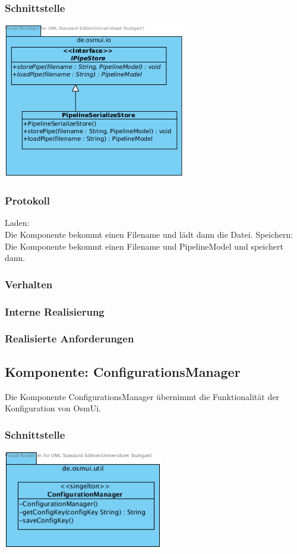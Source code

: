 \documentclass[a4paper,12pt]{scrartcl}
\begin{document}
\subsubsection{Schnittstelle}
\begin{center}
\includegraphics[width=8cm]{Schnittstelle_IPipeStore.png}
\end{center}
\subsubsection{Protokoll}
Laden: \\
Die Komponente bekommt einen Filename und lädt dann die Datei.
Speichern: \\
Die Komponente bekommt einen Filename und PipelineModel und speichert dann.
\subsubsection{Verhalten}
\subsubsection{Interne Realisierung}
\subsubsection{Realisierte Anforderungen}

\subsection{Komponente: ConfigurationsManager}
Die Komponente ConfigurationsManager übernimmt die Funktionalität der Konfiguration von OsmUi.
\subsubsection{Schnittstelle}
\begin{center}
\includegraphics[width=7cm]{Schnittstelle_ConfigurationManager.png}
\end{center}
\end{document}
